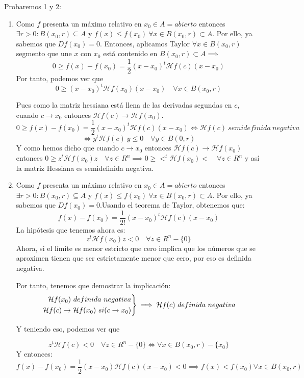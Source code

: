 \documentclass[11pt, a4paper, titlepage]{article}
\makeatletter
\renewenvironment{proof}[1][\proofname] {\vspace{-15pt}\par\pushQED{\qed}\normalfont\topsep6\p@\@plus6\p@\relax\trivlist\item[\hskip\labelsep\it#1\@addpunct{.}]\ignorespaces}{\popQED\endtrivlist\@endpefalse}
\theoremstyle{theorem-style}
\theoremstyle{definition-style}
\theoremstyle{remark-style}
\theoremstyle{example-style}
\newenvironment{rcases}
  {\left.\begin{aligned}}
  {\end{aligned}\right\rbrace}
\makeatother
\begin{document}
\begin{proof} Probaremos 1 y 2: 
	\begin{enumerate}
	\item Como $f$ presenta un máximo relativo en $x_0\in A=abierto$ entonces $\exists r > 0 : B(x_0,r) \subseteq A $ y $f(x) \leq f(x_0) \ \forall x \in B(x_0,r)\subset A$. Por ello, ya sabemos que $Df(x_0) = 0$. Entonces, aplicamos Taylor $\forall x \in B(x_0,r)$ segmento que une $x$ con $x_0$ está contenido en $B(x_0,r) \subset A \implies $
	\[
	0 \geq f(x) - f(x_0) =  \frac{1}{2}(x-x_0)^t \mathcal{H}f(c)(x-x_0)
	\]
	Por tanto, podemos ver que 
	\[
	0 \geq (x-x_0)^t \mathcal{H}f(x_0)(x-x_0) \quad \forall x \in B(x_0,r)
	\]
	
	Pues como la matriz hessiana está llena de las derivadas segundas en $c$, cuando $c \to x_0$ entonces $\mathcal{H}f(c) \to \mathcal{H}f(x_0)$.
\[
	0 \geq f(x) - f(x_0) =  \frac{1}{2}(x-x_0)^t \mathcal{H}f(c)(x-x_0) \iff \mathcal{H}f(c) \ semidefinida \ negativa
	\]
	\[
	 \iff y^t\mathcal{H}f(c) \ y \leq 0 \quad \forall y \in B(0,r)
	\]
	Y como hemos dicho que cuando $c \to x_0$ entonces $\mathcal{H}f(c) \to \mathcal{H}f(x_0)$ entonces $0 \geq z^t \mathcal{H}f(x_0)z \quad \forall z \in R^n \implies 0 \geq <^t \mathcal{H}f(x_0)< \quad \forall z \in R^n$ y así la matriz Hessiana es semidefinida negativa.
	
	\item Como $f$ presenta un máximo relativo en $x_0\in A=abierto$ entonces $\exists r > 0 : B(x_0,r) \subseteq A $ y $f(x) \leq f(x_0) \ \forall x \in B(x_0,r)\subset A$. Por ello, ya sabemos que $Df(x_0) = 0$.Usando el teorema de Taylor, obtenemos que:
	\[
	f(x)-f(x_0) = \frac{1}{2!}(x-x_0)^t \mathcal{H}f(c)(x-x_0)
	\]
	La hipótesis que tenemos ahora es:
	\[
	z^t \mathcal{H}f(x_0)z < 0 \quad \forall z \in R^n-\{0\}
	\]
	Ahora, si el límite es menor estricto que cero implica que los números que se aproximen tienen que ser estrictamente menor que cero, por eso es definida negativa.
	
	Por tanto, tenemos que demostrar la implicación:
	\[
	\begin{rcases}
	\mathcal{H}f(x_0) \ definida \ negativa\\
	\mathcal{H}f(c) \to \mathcal{H}f(x_0) \ si (c \to x_0)
\end{rcases} \implies \mathcal{H}f(c) \ definida \ negativa
	\]

	Y teniendo eso, podemos ver que
	
	\[
	z^t \mathcal{H}f(c) < 0 \quad \forall z \in R^n-\{0\} \iff \forall x \in B(x_0,r)-\{x_0\}
	\]
	Y entonces:
	\[
	f(x) - f(x_0) =  \frac{1}{2}(x-x_0)\mathcal{H}f(c)(x-x_0) < 0 \implies f(x) < f(x_0) \forall x \in B(x_0,r)
	\]
\end{enumerate}
\end{proof}
\end{document}
